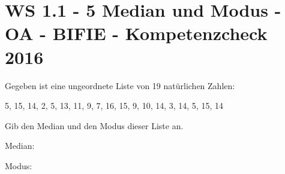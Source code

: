 \section{WS 1.1 - 5 Median und Modus - OA - BIFIE - Kompetenzcheck 2016}

\begin{beispiel}[WS 1.1]{1} %
				Gegeben ist eine ungeordnete Liste von 19 natürlichen Zahlen:
				
5, 15, 14, 2, 5, 13, 11, 9, 7, 16, 15, 9, 10, 14, 3, 14, 5, 15, 14

Gib den Median und den Modus dieser Liste an.

Median:

Modus:

\end{beispiel}